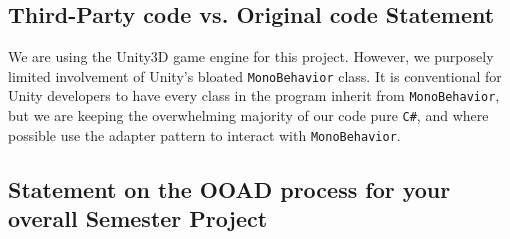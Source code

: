 \documentclass[11pt]{amsart}
\begin{document}
\subsection*{Third-Party code vs. Original code Statement} \phantom{}

We are using the Unity3D game engine for this project. However, we purposely limited involvement of Unity's bloated \texttt{MonoBehavior} class. It is conventional for Unity developers to have every class in the program inherit from \texttt{MonoBehavior}, but we are keeping the overwhelming majority of our code pure \texttt{C\#}, and where possible use the adapter pattern to interact with \texttt{MonoBehavior}. 

\subsection*{Statement on the OOAD process for your overall Semester Project} \phantom{}
\end{document}

